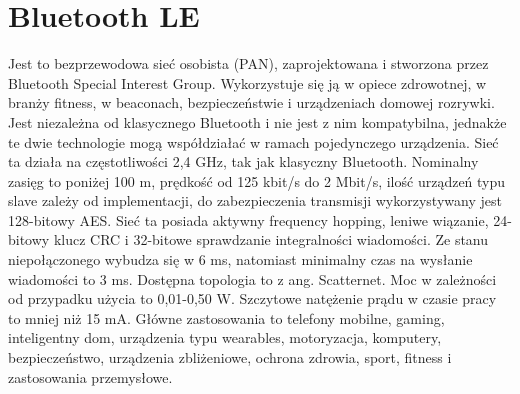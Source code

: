 \section{Bluetooth LE}
Jest to bezprzewodowa sieć osobista (PAN), zaprojektowana i stworzona przez Bluetooth Special Interest Group. Wykorzystuje się ją w opiece zdrowotnej, w branży fitness, w beaconach, bezpieczeństwie i urządzeniach domowej rozrywki. Jest niezależna od klasycznego Bluetooth i nie jest z nim kompatybilna, jednakże te dwie technologie mogą współdziałać w ramach pojedynczego urządzenia.
Sieć ta działa na częstotliwości 2,4 GHz, tak jak klasyczny Bluetooth.
Nominalny zasięg to poniżej 100 m, prędkość od 125 kbit/s do 2 Mbit/s, ilość urządzeń typu slave zależy od implementacji, do zabezpieczenia transmisji wykorzystywany jest 128-bitowy AES.
Sieć ta posiada aktywny frequency hopping, leniwe wiązanie, 24-bitowy klucz CRC i 32-bitowe sprawdzanie integralności wiadomości.
Ze stanu niepołączonego wybudza się w 6 ms, natomiast minimalny czas na wysłanie wiadomości to 3 ms.
Dostępna topologia to z ang. Scatternet.
Moc w zależności od przypadku użycia to 0,01-0,50 W.
Szczytowe natężenie prądu w czasie pracy to mniej niż 15 mA.
Główne zastosowania to telefony mobilne, gaming, inteligentny dom, urządzenia typu wearables, motoryzacja, komputery, bezpieczeństwo, urządzenia zbliżeniowe, ochrona zdrowia, sport, fitness i zastosowania przemysłowe\cite{Wikipedia:ble:2024}.